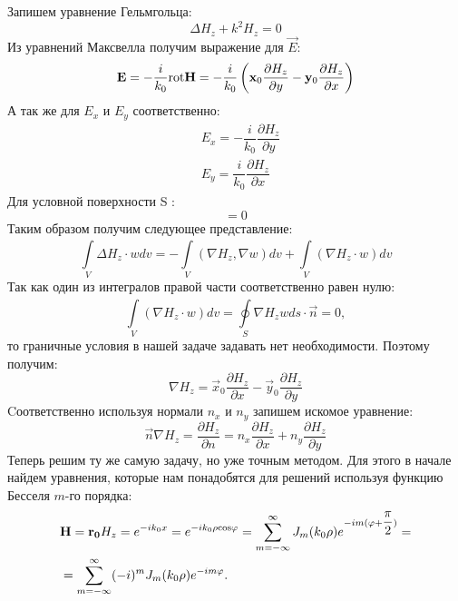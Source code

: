 Запишем уравнение Гельмгольца:
\begin{equation}
\Delta H_{z} + k^2H_{z} = 0
\end{equation}
Из уравнений Максвелла получим выражение для $\vec{E}$:
\begin{equation}
	\vec{E} = - \dfrac{i}{k_{0}} {\rm rot}\vec{H} = - \dfrac{i}{k_{0}} \left({\vec x}_{0}\dfrac{\partial {H_{z}}}{\partial y} - {\vec y}_{0}\dfrac{\partial {H_{z}}}{\partial x}\right)
\end{equation}
А так же для $ E_{x}$ и $E_{y} $ соответственно:
\begin{align}
	&E_{x} = - 
	\dfrac{i}{k_{0}}
	\dfrac{\partial{H_{z}}}{\partial y} \\
	&E_{y} = \dfrac{i}{k_{0}}
	\dfrac{\partial{H_{z}}}{\partial x}
\end{align}
Для условной поверхности S : \\
\begin{equation}
[\vec{n}, \vec{x_{0}}E_{x} + \vec{y_{0}}E_{y}] = 0
\end{equation}
Таким образом получим следующее представление:
\begin{equation}
	\int\limits_{V}^{} \Delta H_{z} \cdot wdv = - \int\limits_{V}^{}(\nabla H_{z}, \nabla w)dv +  \int\limits_{V}^{}(\nabla H_{z} \cdot w)dv
\end{equation}
Так как один из интегралов правой части соответственно равен нулю: 
\begin{equation}
	\int\limits_{V}^{}(\nabla H_{z} \cdot w)dv = \oint\limits_{S}^{} \nabla H_{z}  wds \cdot \vec{n} = 0,
\end{equation}
то граничные условия в нашей задаче задавать нет необходимости.
Поэтому получим:
\begin{equation}
	\nabla H_{z} = \vec{x}_{0} \dfrac{\partial H_{z}}{\partial x} - \vec{y}_{0}
	\dfrac{\partial H_{z}}{\partial y}
\end{equation}
Cоответственно используя нормали $n_{x}$ и $n_{y}$  запишем искомое уравнение:
\begin{equation}
	\vec{n}\nabla H_{z} = \dfrac{\partial H_{z}}{\partial n} = 
	n_{x}\dfrac{\partial H_{z}}{\partial x} +
	n_{y}\dfrac{\partial H_{z}}{\partial y}
\end{equation}
Теперь решим ту же самую задачу, но уже точным методом. Для этого в начале найдем уравнения, которые нам понадобятся для решений используя функцию Бесселя $m$-го порядка:
\begin{align}
	&\vec{H} = \vec{r_{0}}H_{z}
	 = e^{-ik_{0}x} = e^{-ik_{0}\rho \rm cos\varphi} = 
	\sum\limits_{m=-\infty}^{\infty} J_{m}(k_{0}\rho)e^{-im(\varphi + \dfrac{\pi}{2})} =\notag\\
	&= \sum\limits_{m=-\infty}^{\infty} (-i)^{m}J_{m}(k_{0}\rho)e^{-im\varphi}.
\end{align}
